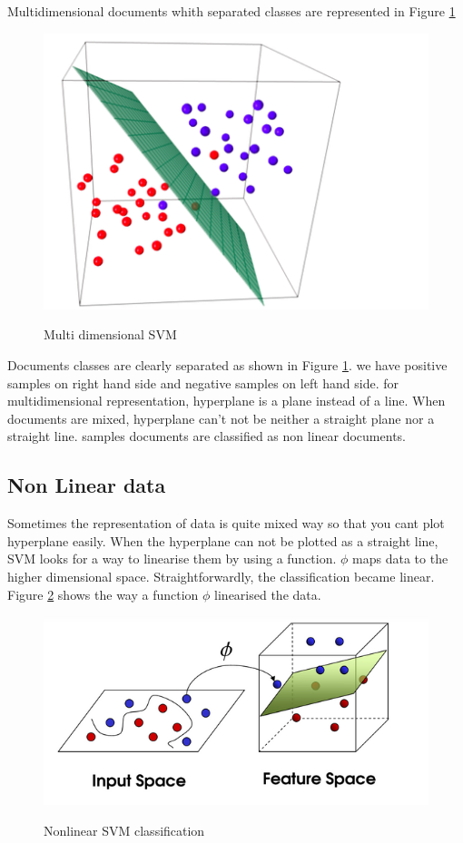 Multidimensional documents whith separated classes are represented in Figure \ref{MDSVM}
\begin{figure}[hbtp]
\caption{Multi dimensional SVM}
\includegraphics[scale=.6]{images/multi.png}\label{MDSVM}
\end{figure}

Documents classes are clearly separated as shown in Figure \ref{MDSVM}. we have positive samples on right hand side and negative samples on left hand side. for multidimensional representation, hyperplane is a plane instead of a line. When documents are mixed, hyperplane can't not be neither a straight plane nor a straight line. samples documents are classified as non linear documents.
\newpage
\subsection{Non Linear data} 
Sometimes the representation of data is quite mixed way so that you cant plot hyperplane easily. When the hyperplane can not be plotted as a straight line,  SVM looks for a way to linearise them by using a function. $ \phi$ maps data to the higher dimensional space. Straightforwardly, the classification became linear. Figure \ref{SVMNL} shows the way a function $ \phi$ linearised the data.



\begin{figure}[hbtp]
\caption{Nonlinear SVM classification \citep{moreira2013finding}}
\centering
\includegraphics[scale=.7]{images/SVMNL.png}\label{SVMNL}
\end{figure}

